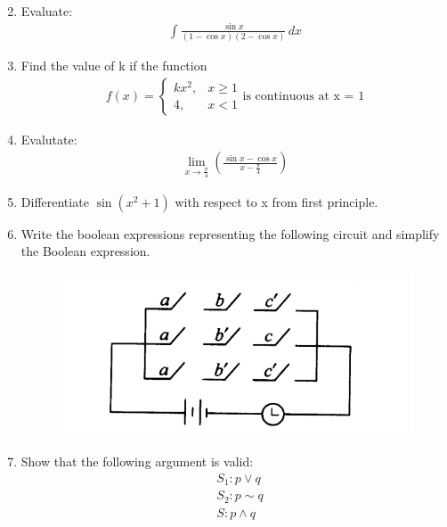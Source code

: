 \documentclass[journal,12pt,twocolumn]{IEEEtran}
\begin{document}
\begin{enumerate}
\begin{align}
\end{align}
\item Evaluate: 
\begin{align}
    \int \displaystyle\frac{\sin x}{(1-\cos x)(2-\cos x)}\, dx \nonumber
\end{align} 
\item Find the value of k if the function
\begin{align}
    f(x) =
   \left\{
\begin{array}{ll}
      kx^2, & x\geq 1 \\
      4, & x <  1 
\end{array} \right. 
\text{is continuous at x = 1} \nonumber
\end{align}

 \item Evalutate: 
 \begin{align}
    \lim_{x\to\frac{\pi}{4}} \left(\displaystyle\frac{\sin x - \cos x}{x - \displaystyle\frac{\pi}{4}}\right) \nonumber
 \end{align}
 
 \item Differentiate  $ \sin (x^2 + 1) $ with respect to x from first principle.

 \item Write the boolean expressions representing the following circuit and simplify the Boolean expression.
 \begin{figure}[h!]
   \centering
   \includegraphics[width=1\columnwidth]{1.png}
   \caption{}
\end{figure}

 \item Show that the following argument is valid:
 \begin{align}
    & S_1 : p \vee q \nonumber \\
    & S_2 : p \sim q \nonumber\\
    & S : p \wedge q \nonumber
 \end{align}


\end{enumerate}
\end{document}
